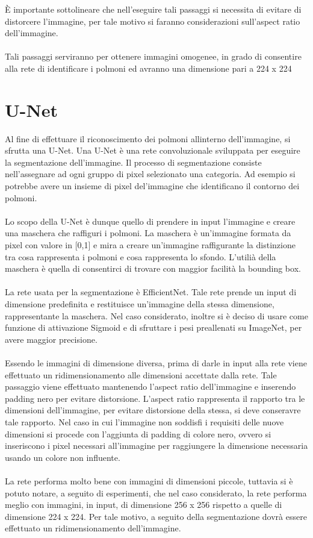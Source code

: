 È importante sottolineare che nell'eseguire tali passaggi si necessita di evitare di distorcere l'immagine, per tale 
motivo si faranno considerazioni sull'aspect ratio dell'immagine. 
\\\\
Tali passaggi serviranno per ottenere immagini omogenee, in grado di consentire alla rete di identificare i polmoni ed avranno 
una dimensione pari a 224 x 224
\section{U-Net}
Al fine di effettuare il riconoscimento dei polmoni allinterno dell'immagine, si sfrutta una U-Net.
Una U-Net è una rete convoluzionale sviluppata per eseguire la segmentazione dell'immagine. Il processo di segmentazione consiste nell'assegnare ad 
ogni gruppo di pixel selezionato una categoria. Ad esempio si potrebbe avere un insieme di pixel del'immagine che identificano il contorno dei polmoni.
\\\\
Lo scopo della U-Net è dunque quello di prendere in input l'immagine e creare una maschera che raffiguri i polmoni.
La maschera è un'immagine formata da pixel con valore in [0,1] e mira a creare un'immagine raffigurante la distinzione tra cosa rappresenta 
i polmoni e cosa rappresenta lo sfondo.
L'utilià della maschera è quella di consentirci di trovare con maggior facilità la bounding box.
\\\\
La rete usata per la segmentazione è EfficientNet. Tale rete prende un input di dimensione predefinita e restituisce un'immagine della stessa
dimensione, rappresentante la maschera. Nel caso considerato, inoltre si è deciso di usare come funzione di attivazione Sigmoid e di sfruttare 
i pesi preallenati su ImageNet, per avere maggior precisione.
\\\\
Essendo le immagini di dimensione diversa, prima di darle in input alla rete viene effettuato un ridimensionamento alle dimensioni accettate dalla rete. 
Tale passaggio viene effettuato mantenendo l'aspect ratio dell'immagine e inserendo padding nero per evitare distorsione.
L'aspect ratio rappresenta il rapporto tra le dimensioni dell'immagine, per evitare distorsione della stessa, si deve conseravre tale rapporto.
Nel caso in cui l'immagine non soddisfi i requisiti delle nuove dimensioni si procede con l'aggiunta di padding di colore nero, ovvero si inseriscono i pixel necessari 
all'immagine per raggiungere la dimensione necessaria usando un colore non influente. 
\\\\
La rete performa molto bene con immagini di dimensioni piccole, tuttavia si è potuto notare, a seguito di esperimenti, che nel caso considerato, la rete 
performa meglio con immagini, in input, di dimensione 256 x 256 rispetto a quelle di dimensione 224 x 224.
Per tale motivo, a seguito della segmentazione dovrà essere effettuato un ridimensionamento dell'immagine.

